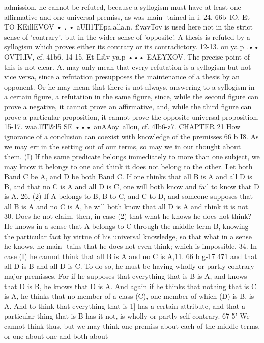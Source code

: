 {{{{{{admission, he cannot be refuted, because a syllogism must have
at least one affirmative and one universal premiss, as was main-
tained in i. 24.
66b~IO. Et TO KEillEVOV • . • aUIl1TEpa.alla.n. £vavT{ov is used
here not in the strict sense of 'contrary', but in the wider sense
of 'opposite'. A thesis is refuted by a syllogism which proves
either its contrary or its contradictory.
12-13. ou ya.p .•• OVTI.IV, cf. 41b6.
14-15. Et Il£v ya.p ••• EAEYXOV. The precise point of this is
not clear. A. may only mean that every refutation is a syllogism
but not vice versa, since a refutation presupposes the maintenance
of a thesis by an opponent. Or he may mean that there is not
always, answering to a syllogism in a certain figure, a refutation
in the same figure, since, while the second figure can prove a
negative, it cannot prove an affirmative, and, while the third
figure can prove a particular proposition, it cannot prove the
opposite universal proposition.
15-17. waa.llTl&l5 SE ••• auAAoy~allou, cf. 4Ib6-z7.
CHAPTER 21
How ignorance of a conclusion can coexist with knowledge of the
premisses
66 b I8. As we may err in the setting out of our terms, so may
we in our thought about them. (I) If the same predicate belongs
immediately to more than one subject, we may know it belongs
to one and think it does not belong to the other. Let both Band
C be A, and D be both Band C. If one thinks that all B is A and
all D is B, and that no C is A and all D is C, one will both know
and fail to know that D is A.
26. (2) If A belongs to B, B to C, and C to D, and someone
supposes that all B is A and no C is A, he will both know that all
D is A and think it is not.
30. Does he not claim, then, in case (2) that what he knows he
does not think? He knows in a sense that A belongs to C through
the middle term B, knowing the particular fact by virtue of his
universal knowledge, so that what in a sense he knows, he main-
tains that he does not even think; which is impossible.
34. In case (I) he cannot think that all B is A and no C is A,11.
66 b g-17
471
and that all D is B and all D is C. To do so, he must be having
wholly or partly contrary major premisses. For if he supposes
that everything that is B is A, and knows that D is B, he knows
that D is A. And again if he thinks that nothing that is C is A,
he thinks that no member of a class (C), one member of which
(D) is B, is A. And to think that everything that is 1] has a
certain attribute, and that a particular thing that is B has it not,
is wholly or partly self-contrary.
67-5' We cannot think thus, but we may think one premiss
about each of the middle terms, or one about one and both about
}}}}}}}
